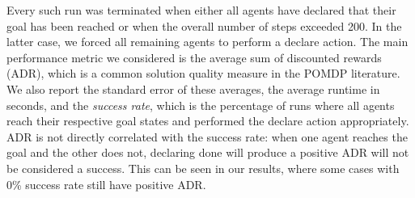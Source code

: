 \documentclass[letterpaper]{article} %
\begin{document}
Every such run was terminated when either all agents have declared that their goal has been reached or when the overall number of steps exceeded 200. In the latter case, we forced all remaining agents to perform a declare action.
The main performance metric we considered is the average sum of discounted rewards (ADR), which is a common solution quality measure in the POMDP literature.
We also report the standard error of these averages, the average runtime in seconds,
and the \emph{success rate}, which is the percentage of runs where all agents reach their respective goal states and performed the declare action appropriately.
ADR is not directly correlated with the success rate: when one agent reaches the goal and the other does not, declaring done will produce a positive ADR will not be considered a success. This can be seen in our results, where some cases with 0\% success rate still have positive ADR.
\end{document}
